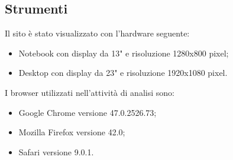 \subsection{Strumenti}
\begin{flushleft}
Il sito è stato visualizzato con l'hardware seguente:
\end{flushleft}
\begin{itemize}
	\item Notebook con display da 13" e risoluzione 1280x800 pixel;
	\item Desktop con display da 23" e risoluzione 1920x1080 pixel.
\end{itemize}
\begin{flushleft}
I browser utilizzati nell'attività di analisi sono:
\end{flushleft}
\begin{itemize}
	\item Google Chrome versione 47.0.2526.73;
	\item Mozilla Firefox versione 42.0;
	\item Safari versione 9.0.1.
\end{itemize}
